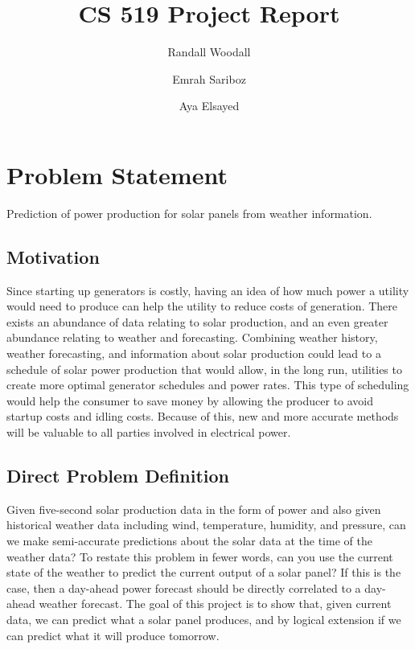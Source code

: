 \documentclass[sigconf]{acmart}
\begin{document}
\title{CS 519 Project Report}

\author{Randall Woodall}

\author{Emrah Sariboz}

\author{Aya Elsayed}

\maketitle

\section{Problem Statement}
Prediction of power production for solar panels from weather information.

\subsection{Motivation}
Since starting up generators is costly, having an idea of how much power a utility would need to produce can help the utility to reduce costs of generation.  There exists an abundance of data relating to solar production, and an even greater abundance relating to weather and forecasting.  Combining weather history, weather forecasting, and information about solar production could lead to a schedule of solar power production that would allow, in the long run, utilities to create more optimal generator schedules and power rates.  This type of scheduling would help the consumer to save money by allowing the producer to avoid startup costs and idling costs.  Because of this, new and more accurate methods will be valuable to all parties involved in electrical power.


\subsection{Direct Problem Definition}
Given five-second solar production data in the form of power and also given historical weather data including wind, temperature, humidity, and pressure, can we make semi-accurate predictions about the solar data at the time of the weather data?  To restate this problem in fewer words, can you use the current state of the weather to predict the current output of a solar panel? If this is the case, then a day-ahead power forecast should be directly correlated to a day-ahead weather forecast.  The goal of this project is to show that, given current data, we can predict what a solar panel produces, and by logical extension if we can predict what it will produce tomorrow.
\end{document}
